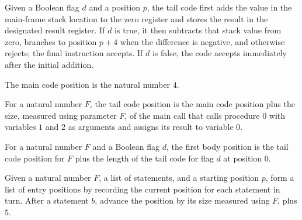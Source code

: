 \begin{definition}
\label{Light.Compiler.tailCode}
\leanok
{}
Given a Boolean flag $d$ and a position $p$, the tail code first adds the value in the
main-frame stack location to the zero register and stores the result in the designated
result register. If $d$ is true, it then subtracts that stack value from zero, branches
to position $p+4$ when the difference is negative, and otherwise rejects; the final
instruction accepts. If $d$ is false, the code accepts immediately after the initial
addition.
\end{definition}

\begin{definition}
\label{Light.Compiler.mainPos}
\leanok
The main code position is the natural number $4$.
\end{definition}

\begin{definition}
\label{Light.Compiler.tailPos}
\leanok
{}
For a natural number $F$, the tail code position is the main code position plus the
size, measured using parameter $F$, of the main call that calls procedure $0$ with
variables $1$ and $2$ as arguments and assigns its result to variable $0$.
\end{definition}

\begin{definition}
\label{Light.Compiler.firstBody}
\leanok
{}
For a natural number $F$ and a Boolean flag $d$, the first body position is the tail
code position for $F$ plus the length of the tail code for flag $d$ at position $0$.
\end{definition}

\begin{definition}
\label{Light.Compiler.entries}
\leanok
{}
Given a natural number $F$, a list of statements, and a starting position $p$, form a
list of entry positions by recording the current position for each statement in turn.
After a statement $b$, advance the position by its size measured using $F$, plus $5$.
\end{definition}

